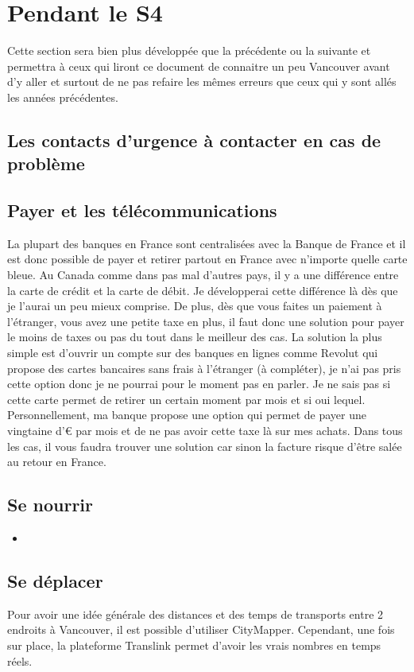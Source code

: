 \documentclass{article}
\begin{document}
\section{Pendant le S4}
Cette section sera bien plus développée que la précédente ou la suivante et permettra à ceux qui liront ce document de connaitre un peu Vancouver avant d'y aller et surtout de ne pas refaire les mêmes erreurs que ceux qui y sont allés les années précédentes. 
\subsection{Les contacts d'urgence à contacter en cas de problème}
\subsection{Payer et les télécommunications}
La plupart des banques en France sont centralisées avec la Banque de France et il est donc possible de payer et retirer partout en France avec n'importe quelle carte bleue. Au Canada comme dans pas mal d'autres pays, il y a une différence entre la carte de crédit et la carte de débit. Je développerai cette différence là dès que je l'aurai un peu mieux comprise. De plus, dès que vous faites un paiement à l'étranger, vous avez une petite taxe en plus, il faut donc une solution pour payer le moins de taxes ou pas du tout dans le meilleur des cas.
La solution la plus simple est d'ouvrir un compte sur des banques en lignes comme Revolut qui propose des cartes bancaires sans frais à l'étranger (à compléter), je n'ai pas pris cette option donc je ne pourrai pour le moment pas en parler. Je ne sais pas si cette carte permet de retirer un certain moment par mois et si oui lequel.\newline
Personnellement, ma banque propose une option qui permet de payer une vingtaine d'€ par mois et de ne pas avoir cette taxe là sur mes achats. Dans tous les cas, il vous faudra trouver une solution car sinon la facture risque d'être salée au retour en France.
\subsection{Se nourrir}
\begin{itemize}
    \item
\end{itemize}
\subsection{Se déplacer}
Pour avoir une idée générale des distances et des temps de transports entre 2 endroits à Vancouver, il est possible d'utiliser CityMapper. Cependant, une fois sur place, la plateforme Translink permet d'avoir les vrais nombres en temps réels.
\end{document}

